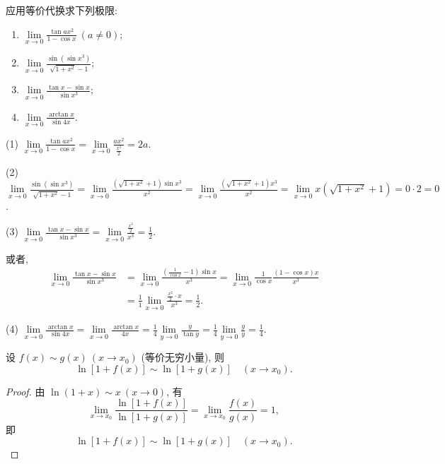 \begin{example}\label{ex:2.3.2}
应用等价代换求下列极限:
\begin{enumerate}[label=(\arabic*)]
  \item $\lim\limits_{x\to0}\frac{\tan ax^2}{1-\cos x}\ (a \neq 0)$;
  \item $\lim\limits_{x\to0}\frac{\sin(\sin x^3)}{\sqrt{1+x^2}-1}$;
  \item $\lim\limits_{x\to0}\frac{\tan x-\sin x}{\sin x^3}$;
  \item $\lim\limits_{x\to0}\frac{\arctan x}{\sin 4x}$.
\end{enumerate}
\end{example}

\begin{solution}
(1) $\lim\limits_{x\to0}\frac{\tan ax^2}{1-\cos x} = \lim\limits_{x\to0}\frac{ax^2}{\frac{x^2}{2}} = 2a$.

(2) $\lim\limits_{x\to0}\frac{\sin(\sin x^3)}{\sqrt{1+x^2}-1} = \lim\limits_{x\to0}\frac{(\sqrt{1+x^2}+1)\sin x^3}{x^2} = \lim\limits_{x\to0}\frac{(\sqrt{1+x^2}+1)x^3}{x^2} = \lim\limits_{x\to0}x(\sqrt{1+x^2}+1) = 0\cdot 2 = 0$.

(3) $\lim\limits_{x\to0}\frac{\tan x-\sin x}{\sin x^3} = \lim\limits_{x\to0}\frac{\frac{x^3}{2}}{x^3} = \frac{1}{2}$.

或者,
\[
\begin{aligned}
\lim_{x\to0}\frac{\tan x-\sin x}{\sin x^3} &= \lim_{x\to0}\frac{\left(\frac{1}{\cos x}-1\right)\sin x}{x^3} = \lim_{x\to0}\frac{1}{\cos x}\frac{(1-\cos x)x}{x^3} \\
&= \frac{1}{1}\lim_{x\to0}\frac{\frac{x^2}{2}\cdot x}{x^3} = \frac{1}{2}.
\end{aligned}
\]

(4) $\lim\limits_{x\to0}\frac{\arctan x}{\sin 4x} = \lim\limits_{x\to0}\frac{\arctan x}{4x} = \frac{1}{4}\lim\limits_{y\to0}\frac{y}{\tan y} = \frac{1}{4}\lim\limits_{y\to0}\frac{y}{y} = \frac{1}{4}$.
\end{solution}

\begin{example}\label{ex:2.3.3}
设 $f(x) \sim g(x)\ (x \to x_0)$ (等价无穷小量), 则
\[
\ln[1+f(x)] \sim \ln[1+g(x)]\quad (x \to x_0).
\]
\end{example}

\begin{proof}
由 $\ln(1+x) \sim x\ (x \to 0)$, 有
\[
\lim_{x\to x_0}\frac{\ln[1+f(x)]}{\ln[1+g(x)]} = \lim_{x\to x_0}\frac{f(x)}{g(x)} = 1,
\]
即
\[
\ln[1+f(x)] \sim \ln[1+g(x)]\quad (x \to x_0).
\]
\end{proof}


